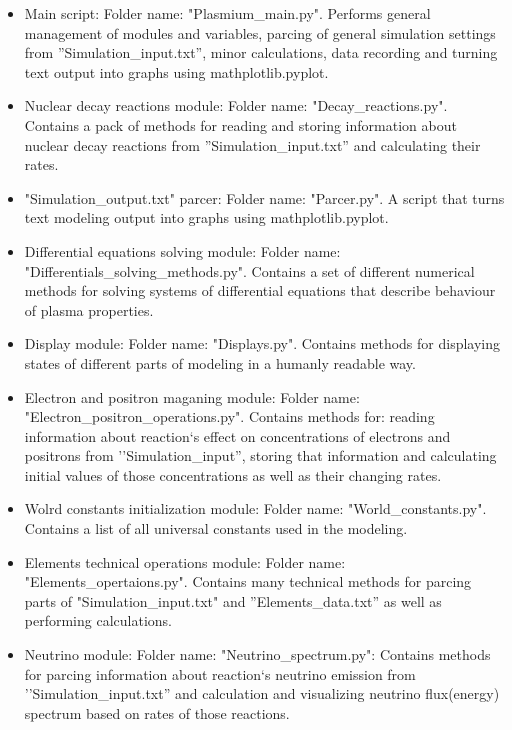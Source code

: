 \documentclass[a4paper,12pt]{article}
\begin{document}
\begin{itemize}

\item Main script: Folder name: "Plasmium\_main.py". Performs general management of modules and variables, parcing of general simulation settings from ''Simulation\_input.txt'', minor calculations, data recording and turning text output into graphs using mathplotlib.pyplot.

\item Nuclear decay reactions module: Folder name: "Decay\_reactions.py". Contains a pack of methods for reading and storing information about nuclear decay reactions from ''Simulation\_input.txt'' and calculating their rates.

\item "Simulation\_output.txt" parcer: Folder name: "Parcer.py". A script that turns text modeling output into graphs using mathplotlib.pyplot.

\item Differential equations solving module: Folder name: "Differentials\_solving\_methods.py". Contains a set of different numerical methods for solving systems of differential equations that describe behaviour of plasma properties.

\item Display module: Folder name: "Displays.py". Contains methods for displaying states of different parts of modeling in a humanly readable way.

\item Electron and positron maganing module: Folder name: "Electron\_positron\_operations.py". Contains methods for: reading information about reaction`s effect on concentrations of electrons and positrons from ''Simulation\_input'', storing that information and calculating initial values of those concentrations as well as their changing rates.

\item Wolrd constants initialization module: Folder name: "World\_constants.py". Contains a list of all universal constants used in the modeling.

\item Elements technical operations module: Folder name: "Elements\_opertaions.py". Contains many technical methods for parcing parts of "Simulation\_input.txt" and ''Elements\_data.txt'' as well as performing calculations.

\item Neutrino module: Folder name: "Neutrino\_spectrum.py": Contains methods for parcing information about reaction`s neutrino emission from ''Simulation\_input.txt'' and calculation and visualizing neutrino flux(energy) spectrum based on rates of those reactions.


\end{itemize}
\end{document}
